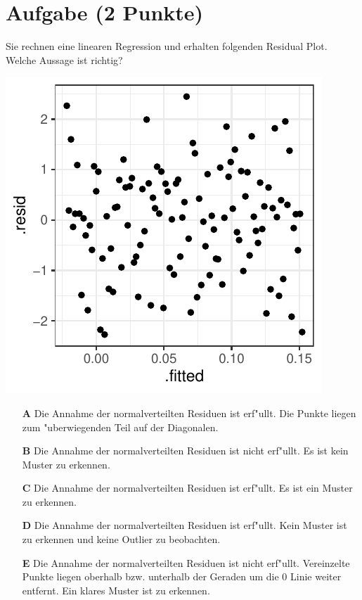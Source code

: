 \documentclass[a4paper, 10pt]{scrartcl}\usepackage[]{graphicx}\usepackage[]{xcolor}
\makeatletter
\def\maxwidth{ %
  \ifdim\Gin@nat@width>\linewidth
    \linewidth
  \else
    \Gin@nat@width
  \fi
}
\makeatother
\begin{document}
\section{Aufgabe \hfill (2 Punkte)}

Sie rechnen eine linearen Regression und erhalten folgenden Residual
Plot. Welche Aussage ist richtig?




{\centering \includegraphics[width=\maxwidth]{img/mc-regression-06-a-1} 

}







\begin{enumerate}
\item [\textbf{A} \msquare] Die Annahme der normalverteilten Residuen ist erf{"u}llt. Die Punkte liegen zum {"u}berwiegenden Teil auf der Diagonalen.
\item [\textbf{B} \msquare] Die Annahme der normalverteilten Residuen ist nicht erf{"u}llt. Es ist kein Muster zu erkennen.
\item [\textbf{C} \msquare] Die Annahme der normalverteilten Residuen ist erf{"u}llt. Es ist ein Muster zu erkennen.
\item [\textbf{D} \msquare] Die Annahme der normalverteilten Residuen ist erf{"u}llt. Kein Muster ist zu erkennen und keine Outlier zu beobachten.
\item [\textbf{E} \msquare] Die Annahme der normalverteilten Residuen ist nicht erf{"u}llt. Vereinzelte Punkte liegen oberhalb bzw. unterhalb der Geraden um die 0 Linie weiter entfernt. Ein klares Muster ist zu erkennen.
\end{enumerate}
\end{document}

